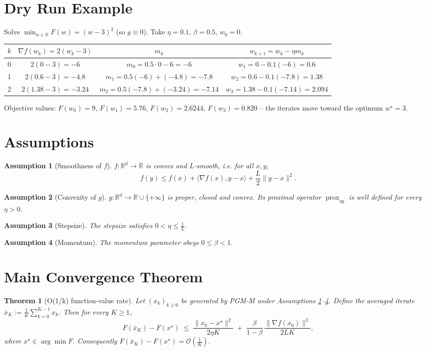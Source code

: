 \documentclass{article}
\newtheorem{theorem}{Theorem}
\newtheorem{assumption}{Assumption}
\newcommand{\prox}{\operatorname{prox}}
\newcommand{\grad}{\nabla}
\begin{document}
\section*{Dry Run Example}
Solve $\displaystyle\min_{w\in\mathbb{R}}F(w)= (w-3)^2$ (so $g\equiv0$).  
Take $\eta=0.1$, $\beta=0.5$, $w_0=0$.

\begin{center}
\begin{tabular}{c|c|c|c}
$k$ & $\grad f(w_k)=2(w_k-3)$ & $m_k$ & $w_{k+1}=w_k-\eta m_k$ \\ \hline
0 & $2(0-3)=-6$ & $m_0=0.5\cdot0-6=-6$ & $w_1=0-0.1(-6)=0.6$ \\[4pt]
1 & $2(0.6-3)=-4.8$ & $m_1=0.5(-6)+(-4.8)=-7.8$ & $w_2=0.6-0.1(-7.8)=1.38$ \\[4pt]
2 & $2(1.38-3)=-3.24$ & $m_2=0.5(-7.8)+(-3.24)=-7.14$ & $w_3=1.38-0.1(-7.14)=2.094$ 
\end{tabular}
\end{center}

Objective values: $F(w_0)=9$, $F(w_1)=5.76$, $F(w_2)=2.6244$, $F(w_3)=0.820$ – the iterates move toward the optimum $w^\star=3$.

\newpage
\section*{Assumptions}
\begin{assumption}[Smoothness of $f$]\label{asm:smooth}
$f:\mathbb{R}^d\to\mathbb{R}$ is convex and $L$‑smooth, i.e. for all $x,y$,
\[
f(y)\le f(x)+\langle\grad f(x),y-x\rangle+\frac{L}{2}\|y-x\|^2 .
\tag{A1}
\]
\end{assumption}
\begin{assumption}[Convexity of $g$]\label{asm:convex}
$g:\mathbb{R}^d\to\mathbb{R}\cup\{+\infty\}$ is proper, closed and convex. Its proximal operator
$\prox_{\eta g}$ is well defined for every $\eta>0$.
\end{assumption}
\begin{assumption}[Stepsize]\label{asm:stepsize}
The stepsize satisfies $0<\eta\le\frac{1}{L}$.
\end{assumption}
\begin{assumption}[Momentum]\label{asm:momentum}
The momentum parameter obeys $0\le\beta<1$.
\end{assumption}

\section*{Main Convergence Theorem}
\begin{theorem}[O(1/k) function‑value rate]\label{thm:rate}
Let $(x_k)_{k\ge0}$ be generated by PGM‑M under Assumptions \ref{asm:smooth}–\ref{asm:momentum}.
Define the averaged iterate $\bar{x}_K:=\frac{1}{K}\sum_{k=0}^{K-1}x_k$.
Then for every $K\ge1$,
\[
F(\bar{x}_K)-F(x^\star)\;\le\;
\frac{\|x_0-x^\star\|^2}{2\eta K}\;+\;
\frac{\beta}{1-\beta}\,\frac{\| \grad f(x_0)\|^2}{2L K},
\tag{T1}
\]
where $x^\star\in\arg\min F$.
Consequently $F(\bar{x}_K)-F(x^\star)=\mathcal O\!\left(\frac{1}{K}\right)$.
\end{theorem}
\end{document}
